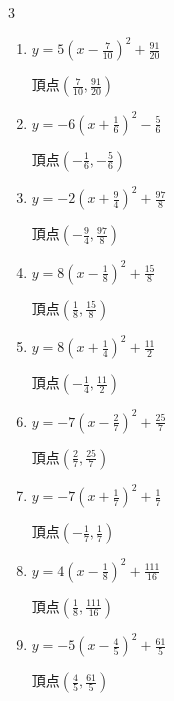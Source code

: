 \begin{multicols}{3}
\begin{enumerate}
        $\displaystyle 頂点\left( -\frac{3}{8} , -\frac{49}{8} \right)$

  \item $\displaystyle y=5\left( x-\frac{7}{10}\right)^{2}+\frac{91}{20}$

        $\displaystyle 頂点\left( \frac{7}{10} , \frac{91}{20} \right)$

  \item $\displaystyle y=-6\left( x+\frac{1}{6}\right)^{2}-\frac{5}{6}$

        $\displaystyle 頂点\left( -\frac{1}{6} , -\frac{5}{6} \right)$

  \item $\displaystyle y=-2\left( x+\frac{9}{4}\right)^{2}+\frac{97}{8}$

        $\displaystyle 頂点\left( -\frac{9}{4} , \frac{97}{8} \right)$

  \item $\displaystyle y=8\left( x-\frac{1}{8}\right)^{2}+\frac{15}{8}$

        $\displaystyle 頂点\left( \frac{1}{8} , \frac{15}{8} \right)$

  \item $\displaystyle y=8\left( x+\frac{1}{4}\right)^{2}+\frac{11}{2}$

        $\displaystyle 頂点\left( -\frac{1}{4} , \frac{11}{2} \right)$

  \item $\displaystyle y=-7\left( x-\frac{2}{7}\right)^{2}+\frac{25}{7}$

        $\displaystyle 頂点\left( \frac{2}{7} , \frac{25}{7} \right)$

  \item $\displaystyle y=-7\left( x+\frac{1}{7}\right)^{2}+\frac{1}{7}$

        $\displaystyle 頂点\left( -\frac{1}{7} , \frac{1}{7} \right)$

  \item $\displaystyle y=4\left( x-\frac{1}{8}\right)^{2}+\frac{111}{16}$

        $\displaystyle 頂点\left( \frac{1}{8} , \frac{111}{16} \right)$

\columnbreak %

\resetques

  \item $\displaystyle y=-5\left( x-\frac{4}{5}\right)^{2}+\frac{61}{5}$

        $\displaystyle 頂点\left( \frac{4}{5} , \frac{61}{5} \right)$


\end{enumerate}
\end{multicols}
